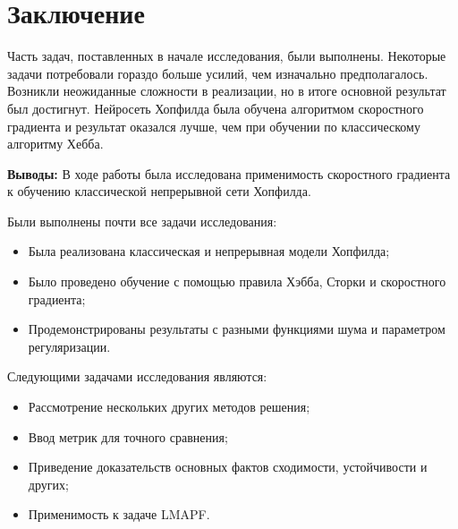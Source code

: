 \section{Заключение}
Часть задач, поставленных в начале исследования, были выполнены.
Некоторые задачи потребовали гораздо больше усилий, чем изначально
предполагалось. Возникли неожиданные сложности в реализации, но
в итоге основной результат был достигнут. Нейросеть Хопфилда
была обучена алгоритмом скоростного градиента и результат оказался
лучше, чем при обучении по классическому алгоритму Хебба.

\textbf{Выводы:}
В ходе работы была исследована применимость скоростного градиента к
обучению классической непрерывной сети Хопфилда.

Были выполнены почти все задачи исследования:
\begin{itemize}
  \item
        Была реализована классическая и непрерывная модели Хопфилда;
  \item
        Было проведено обучение с помощью правила Хэбба, Сторки и скоростного
        градиента;
  \item
        Продемонстрированы результаты с разными функциями шума и
        параметром регуляризации.
\end{itemize}


Следующими задачами исследования являются:
\begin{itemize}
  \item Рассмотрение нескольких других методов решения;
  \item Ввод метрик для точного сравнения;
  \item Приведение доказательств основных фактов сходимости, устойчивости и других;
  \item Применимость к задаче LMAPF.
\end{itemize}